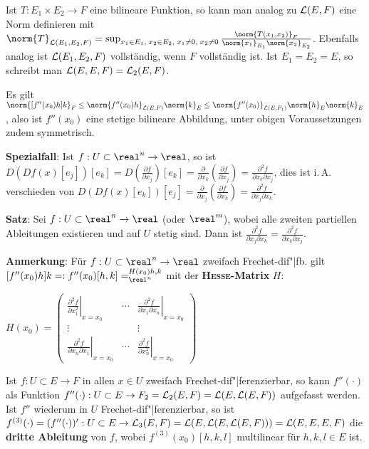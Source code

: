 Ist $T: E_1 \times E_2 \rightarrow F$ eine bilineare Funktion, so kann
man analog zu $\mathcal{L}(E, F)$ eine Norm definieren mit
$\norm{T}_{\L(E_1, E_2, F)} =
\sup_{x_1 \in E_1,\; x_2 \in E_2,\; x_1 \not= 0,\; x_2 \not= 0}
\frac{\norm{T(x_1, x_2)}_F}{\norm{x_1}_{E_1} \norm{x_2}_{E_2}}$.
Ebenfalls analog ist $\mathcal{L}(E_1, E_2, F)$ vollständig, wenn $F$ vollständig ist.
Ist $E_1 = E_2 = E$, so schreibt man $\mathcal{L}(E, E, F) = \mathcal{L}_2(E, F)$.

Es gilt $\norm{[f''(x_0)h]k}_F \le \norm{f''(x_0)h}_{\L(E, F)} \norm{k}_E \le
\norm{f''(x_0)}_{\L(E, F_1)} \norm{h}_E \norm{k}_E$, also ist
$f''(x_0)$ eine stetige bilineare Abbildung,
unter obigen Voraussetzungen zudem symmetrisch.

\linie

\textbf{Spezialfall}:
Ist $f: U \subset \real^n \rightarrow \real$, so ist
$D(Df(x)[e_j])[e_k] = D(\frac{\partial f}{\partial x_j})[e_k] =
\frac{\partial}{\partial x_k} \left(\frac{\partial f}{\partial x_j}\right) =
\frac{\partial^2 f}{\partial x_k \partial x_j}$, dies ist i.\,A.
verschieden von $D(Df(x)[e_k])[e_j] =
\frac{\partial}{\partial x_j} \left(\frac{\partial f}{\partial x_k}\right) =
\frac{\partial^2 f}{\partial x_j \partial x_k}$.

\textbf{Satz}:
Sei $f: U \subset \real^n \rightarrow \real$ (oder $\real^m$),
wobei alle zweiten partiellen Ableitungen existieren und auf $U$ stetig
sind.
Dann ist $\frac{\partial^2 f}{\partial x_j \partial x_k} =
\frac{\partial^2 f}{\partial x_k \partial x_j}$.

\textbf{Anmerkung}:
Für $f: U \subset \real^n \rightarrow \real$ zweifach Frechet-dif"|fb. gilt
$[f''(x_0)h]k =: f''(x_0)[h, k] = \sp{H(x_0)h, k}_{\real^n}$ mit
der \textbf{\textsc{Hesse}-Matrix} $H$:

$H(x_0) = \begin{pmatrix}
\left.\frac{\partial^2 f}{\partial x_1^2}\right|_{x=x_0} &
\cdots &
\left.\frac{\partial^2 f}{\partial x_1 \partial x_n}\right|_{x=x_0} \\
\vdots & & \vdots \\
\left.\frac{\partial^2 f}{\partial x_n \partial x_1}\right|_{x=x_0} &
\cdots &
\left.\frac{\partial^2 f}{\partial x_n^2}\right|_{x=x_0}
\end{pmatrix}$

\vspace{10pt}
\linie

Ist $f: U \subset E \rightarrow F$ in allen $x \in U$ zweifach
Frechet-dif"|ferenzierbar, so kann $f''(\cdot)$
als Funktion $f''(\cdot): U \subset E \rightarrow
F_2 = \mathcal{L}_2(E, F) = \mathcal{L}(E, \mathcal{L}(E, F))$ aufgefasst werden. \\
Ist $f''$ wiederum in $U$ Frechet-dif"|ferenzierbar, so ist \\
$f^{(3)}(\cdot) = (f''(\cdot))': U \subset E \rightarrow \mathcal{L}_3(E, F)
= \mathcal{L}(E, \mathcal{L}(E, \mathcal{L}(E, F))) = \mathcal{L}(E, E, E, F)$ die
\textbf{dritte Ableitung} von $f$, wobei
$f^{(3)}(x_0)[h, k, l]$ multilinear für $h, k, l \in E$ ist.


